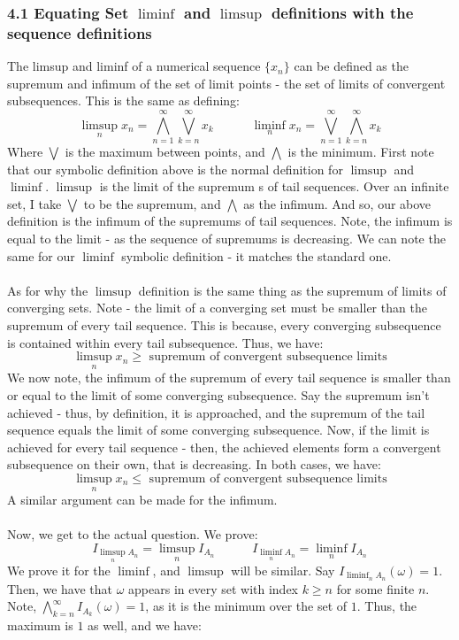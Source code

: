 \documentclass[12pt,a4paper]{article}
\newcommand{\1}[1]{\mathbbm{1}\left\{ #1 \right\}}
\begin{document}
\subsubsection{4.1 Equating Set $\liminf$ and $\limsup$ definitions with the sequence definitions} The limsup and liminf of a numerical sequence $\{x_n\}$ can be defined as the supremum and infimum of the set of limit points - the set of limits of convergent subsequences. This is the same as defining:
$$
	\limsup_n x_n = \bigwedge_{n=1}^\infty \bigvee_{k=n}^\infty x_k
	\quad\quad\quad
	\liminf_n x_n = \bigvee_{n=1}^\infty \bigwedge_{k=n}^\infty x_k
$$
Where $\bigvee$ is the maximum between points, and $\bigwedge$ is the minimum. First note that our symbolic definition above is the normal definition for $\limsup$ and $\liminf$. $\limsup$ is the limit of the supremum s of tail sequences. Over an infinite set, I take $\bigvee$ to be the supremum, and $\bigwedge$ as the infimum. And so, our above definition is the infimum of the supremums of tail sequences. Note, the infimum is equal to the limit - as the sequence of supremums is decreasing. We can note the same for our $\liminf$ symbolic definition - it matches the standard one.
\\\\
As for why the $\limsup$ definition is the same thing as the supremum of limits of converging sets. Note - the limit of a converging set must be smaller than the supremum of every tail sequence. This is because, every converging subsequence is contained within every tail subsequence. Thus, we have:
$$
	\limsup_n x_n \geq \text{ supremum of convergent subsequence limits}
$$
We now note, the infimum of the supremum of every tail sequence is smaller than or equal to the limit of some converging subsequence. Say the supremum isn't achieved - thus, by definition, it is approached, and the supremum of the tail sequence equals the limit of some converging subsequence. Now, if the limit is achieved for every tail sequence - then, the achieved elements form a convergent subsequence on their own, that is decreasing. In both cases, we have:
$$
	\limsup_n x_n \leq \text{ supremum of convergent subsequence limits}
$$
A similar argument can be made for the infimum.
\\\\
Now, we get to the actual question. We prove:
$$
	I_{\limsup_n A_n} = \limsup_n I_{A_n} \quad\quad\quad
	I_{\liminf_n A_n} = \liminf_n I_{A_n}
$$
We prove it for the $\liminf$, and $\limsup$ will be similar. Say $I_{\liminf_n A_n}(\omega) = 1$. Then, we have that $\omega$ appears in every set with index $k \geq n$ for some finite $n$. Note, $\bigwedge_{k=n}^\infty I_{A_k}(\omega) = 1$, as it is the minimum over the set of $1$. Thus, the maximum is $1$ as well, and we have:
\end{document}
